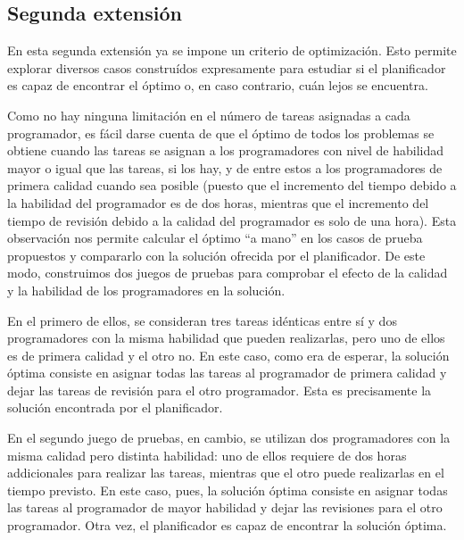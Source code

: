
\subsection{Segunda extensión} \label{sec:res-ext2}

En esta segunda extensión ya se impone un criterio de optimización. Esto 
permite explorar diversos casos construídos expresamente para estudiar si 
el planificador es capaz de encontrar el óptimo o, en caso contrario, cuán 
lejos se encuentra. 

Como no hay ninguna limitación en el número de tareas asignadas a cada 
programador, es fácil darse cuenta de que el óptimo de todos los problemas se 
obtiene cuando las tareas se asignan a los programadores con nivel de 
habilidad mayor o igual que las tareas, si los hay, y de entre estos a los 
programadores de primera calidad cuando sea posible (puesto que el incremento 
del tiempo debido a la habilidad del programador es de dos horas, mientras 
que el incremento del tiempo de revisión debido a la calidad del programador 
es solo de una hora). Esta observación nos permite calcular el óptimo 
``a mano'' en los casos de prueba propuestos y compararlo con la solución 
ofrecida por el planificador. De este modo, construimos dos juegos de 
pruebas para comprobar el efecto de la calidad y la habilidad de los 
programadores en la solución.

En el primero de ellos, se consideran tres tareas idénticas entre sí y dos 
programadores con la misma habilidad que pueden realizarlas, pero uno de 
ellos es de primera calidad y el otro no. En este caso, como era de esperar, 
la solución óptima consiste en asignar todas las tareas al programador de 
primera calidad y dejar las tareas de revisión para el otro programador. Esta 
es precisamente la solución encontrada por el planificador.

En el segundo juego de pruebas, en cambio, se utilizan dos programadores con 
la misma calidad pero distinta habilidad: uno de ellos requiere de dos horas 
addicionales para realizar las tareas, mientras que el otro puede realizarlas 
en el tiempo previsto. En este caso, pues, la solución óptima consiste en 
asignar todas las tareas al programador de mayor habilidad y dejar las 
revisiones para el otro programador. Otra vez, el planificador es capaz de 
encontrar la solución óptima.



